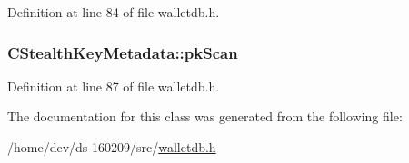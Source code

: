 Definition at line 84 of file walletdb.\+h.

\hypertarget{class_c_stealth_key_metadata_a0444523e7274793bd69269c08f6925db}{}
\subsubsection[{pk\+Scan}]{ C\+Stealth\+Key\+Metadata\+::pk\+Scan}\label{class_c_stealth_key_metadata_a0444523e7274793bd69269c08f6925db}


Definition at line 87 of file walletdb.\+h.



The documentation for this class was generated from the following file\+:\begin{DoxyCompactItemize}
\item 
/home/dev/ds-\/160209/src/\hyperlink{walletdb_8h}{walletdb.\+h}\end{DoxyCompactItemize}
